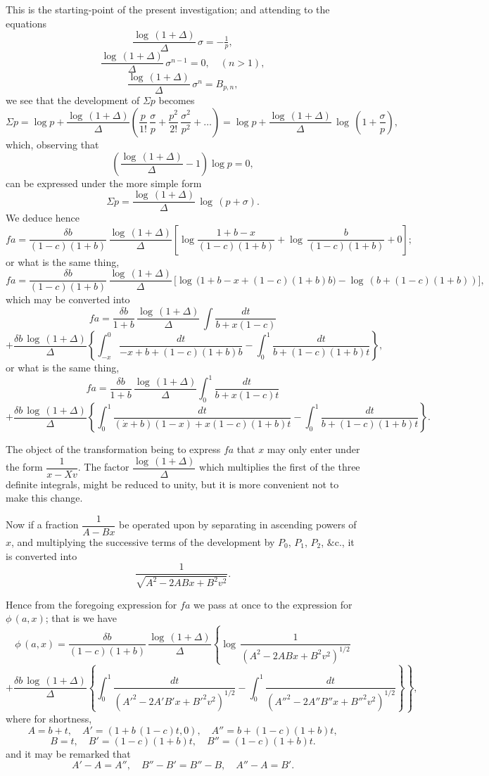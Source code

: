 \documentclass[11pt,a4paper]{article}
\begin{document}
This is the starting-point of the present investigation; and attending to the equations
\[
\frac{\log\,(1+\Delta)}{\Delta}\,\sigma = -\tfrac{1}{p},
\]
\[
\frac{\log\,(1+\Delta)}{\Delta}\,\sigma^{n-1} = 0,\quad (n>1),
\]
\[
\frac{\log\,(1+\Delta)}{\Delta}\,\sigma^n = B_{p,n},
\]
we see that the development of $\Sigma p$ becomes
\[
\Sigma p = \log p + \frac{\log\,(1+\Delta)}{\Delta}\left(\frac{p}{1!}\,\frac{\sigma}{p} + \frac{p^2}{2!}\,\frac{\sigma^2}{p^2} + \ldots\right) = \log p + \frac{\log\,(1+\Delta)}{\Delta}\,\log\,\left(1+\frac{\sigma}{p}\right),
\]
which, observing that
\[
\left(\frac{\log\,(1+\Delta)}{\Delta} - 1\right)\log p = 0,
\]
can be expressed under the more simple form
\[
\Sigma p = \frac{\log\,(1+\Delta)}{\Delta}\,\log\,(p+\sigma).
\]
We deduce hence
\[
fa = \frac{\delta b}{(1-c)(1+b)}\,\frac{\log\,(1+\Delta)}{\Delta}\left[\log\frac{1+b-x}{(1-c)(1+b)} + \log\,\frac{b}{(1-c)(1+b)} + 0\right];
\]
or what is the same thing,
\[
fa = \frac{\delta b}{(1-c)(1+b)}\,\frac{\log\,(1+\Delta)}{\Delta}\,\big[\log\,(1+b-x+(1-c)(1+b)b\big) - \log\,(b+(1-c)(1+b))\big],
\]
which may be converted into
\[
fa = \frac{\delta b}{1+b}\,\frac{\log\,(1+\Delta)}{\Delta}\,\int\frac{dt}{b+x(1-c)}
\]
\[
+\frac{\delta b\,\log\,(1+\Delta)}{\Delta}\left\{\int_{-x}^{0}\frac{dt}{-x+b+(1-c)(1+b)b}-\int_{0}^{1}\frac{dt}{b+(1-c)(1+b)t}\right\},
\]
or what is the same thing,
\[
fa = \frac{\delta b}{1+b}\,\frac{\log\,(1+\Delta)}{\Delta}\int_{0}^{1}\frac{dt}{b+x(1-c)t}
\]
\[
+\frac{\delta b\,\log\,(1+\Delta)}{\Delta}\left\{\int_{0}^{1}\frac{dt}{(\dot{x}+b)(1-x)+x(1-c)(1+b)t}-\int_{0}^{1}\frac{dt}{b+(1-c)(1+b)t}\right\}.
\]

\setcounter{page}{102}

The object of the transformation being to express $fa$ that $x$ may only enter under the form $\dfrac{1}{x-Xv}$. The factor $\dfrac{\log\,(1+\Delta)}{\Delta}$ which multiplies the first of the three definite integrals, might be reduced to unity, but it is more convenient not to make this change.

Now if a fraction $\dfrac{1}{A-Bx}$ be operated upon by separating in ascending powers of $x$, and multiplying the successive terms of the development by $P_0$, $P_1$, $P_2$, $\&$c., it is converted into
\[
\frac{1}{\sqrt{A^2 - 2ABx + B^2v^2}}.
\]

Hence from the foregoing expression for $fa$ we pass at once to the expression for $\phi\,(a,x)$; that is we have
\[
\phi\,(a,x) = \frac{\delta b}{(1-c)(1+b)}\,\frac{\log\,(1+\Delta)}{\Delta}\left\{\log\,\frac{1}{(A^2 - 2ABx + B^2v^2)^{1/2}}\right.
\]
\[
\left.+\frac{\delta b\,\log\,(1+\Delta)}{\Delta}\left\{\int_{0}^{1}\frac{dt}{(A'^2-2A'B'x+B'^2v^2)^{1/2}}-\int_{0}^{1}\frac{dt}{(A''^2-2A''B''x+B''^2v^2)^{1/2}}\right\}\right\},
\]
where for shortness,
\[
A = b+t,\quad A' = (1+b\,(1-c)t,0),\quad A''=b+(1-c)(1+b)t,
\]
\[
B = t,\quad B' = (1-c)(1+b)t,\quad B''=(1-c)(1+b)t.
\]
and it may be remarked that
\[
A'-A=A'',\quad B''-B'=B''-B,\quad A''-A=B'.
\]
\end{document}
